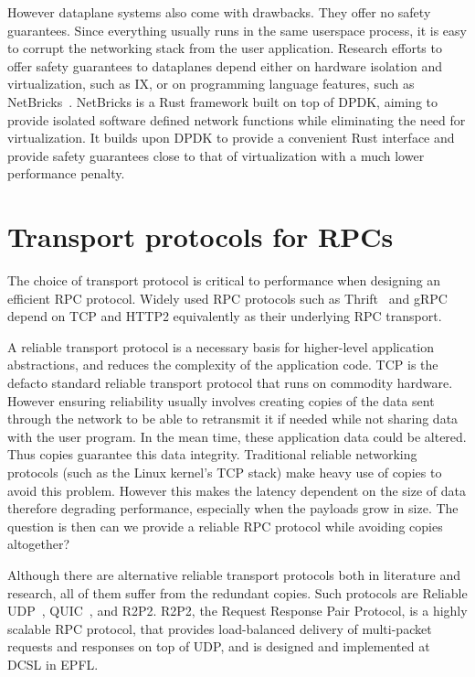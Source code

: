 However dataplane systems also come with drawbacks. They offer no
safety guarantees. Since everything usually runs in the same userspace
process, it is easy to corrupt the networking stack from the user
application. Research efforts to offer safety guarantees to dataplanes
depend either on hardware isolation and virtualization, such as IX,
or on programming language features, such as
NetBricks~\cite{netbricks}. NetBricks is a Rust framework built on top
of DPDK, aiming to provide isolated software defined network functions
while eliminating the need for virtualization. It builds upon DPDK to
provide a convenient Rust interface and provide safety guarantees
close to that of virtualization with a much lower performance
penalty.

\section{Transport protocols for RPCs}

The choice of transport protocol is critical to performance when
designing an efficient RPC protocol.
Widely used RPC protocols such as Thrift~\cite{url:thrift} and gRPC~\cite{url:grpc} depend on TCP and HTTP2 equivalently as their underlying RPC transport.

A reliable transport protocol is a necessary basis for higher-level application abstractions,
and reduces the complexity of the application code.
TCP is the defacto standard reliable transport protocol that runs on commodity hardware.
However ensuring reliability usually involves creating copies of the data sent
through the network to be able to retransmit it if needed while not
sharing data with the user program. In the mean time, these
application data could be altered. Thus copies guarantee this data integrity.
Traditional reliable networking protocols (such as the Linux kernel's
TCP stack) make heavy use of copies to avoid this problem. However
this makes the latency dependent on the size of data therefore
degrading performance, especially when the payloads grow in size. The
question is then can we provide a reliable RPC protocol while avoiding
copies altogether?

Although there are alternative reliable transport protocols both in
literature and research, all of them suffer from the redundant
copies. Such protocols are Reliable UDP~\cite{url:reludp},
QUIC~\cite{url:quic}, and R2P2.  R2P2, the Request Response Pair
Protocol, is a highly scalable RPC protocol, that provides
load-balanced delivery of multi-packet requests and responses on top
of UDP, and is designed and implemented at DCSL in EPFL.

